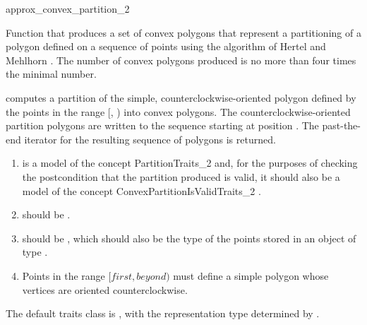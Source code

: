 \begin{ccRefFunction}{approx_convex_partition_2}

\ccDefinition
Function that produces a set of 
convex polygons that represent a partitioning of a polygon defined
on a sequence of points using the algorithm of Hertel and Mehlhorn
\cite{hm-ftsp-83}.  The number of convex polygons produced is 
no more than four times the minimal number.%


{
computes a partition of the simple, counterclockwise-oriented polygon defined 
by the points in the range [, ) into convex 
polygons. The counterclockwise-oriented partition polygons are written to
the sequence starting at position .  The past-the-end iterator for 
the resulting sequence of polygons is returned.
}

\begin{enumerate}
    \item {} is a model of the concept 
          PartitionTraits\_2
          and, for the purposes of checking the postcondition that the partition
          produced is valid, it should also be a model of
          the concept ConvexPartitionIsValidTraits\_2%
          .
    \item {} should be .
    \item {} should be ,
          which should also be the type of the points stored in an object
          of type .
    \item Points in the range $[first, beyond)$ must define a simple polygon
          whose vertices are oriented counterclockwise.
\end{enumerate}

The default traits class  is ,%
with the representation type determined by .


\end{ccRefFunction}
